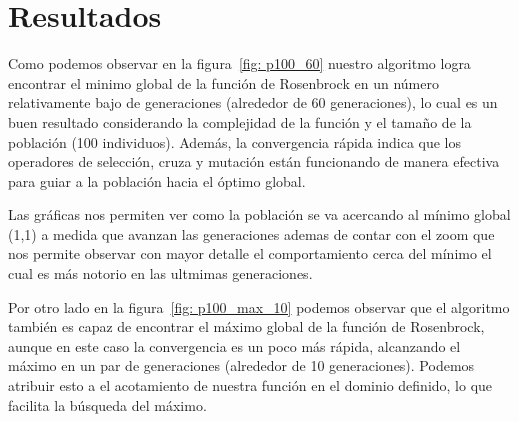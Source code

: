 \section{Resultados}

Como podemos observar en la figura~\ref{fig: p100_60} nuestro algoritmo logra encontrar el minimo global 
de la función de Rosenbrock en un número relativamente bajo de generaciones (alrededor de 60 generaciones), 
lo cual es un buen resultado considerando la complejidad de la función y el tamaño de la población (100 individuos).
Además, la convergencia rápida indica que los operadores de selección, cruza y mutación están funcionando de manera 
efectiva para guiar a la población hacia el óptimo global.

Las gráficas nos permiten ver como la población se va acercando al mínimo global (1,1) a medida que avanzan 
las generaciones ademas de contar con el zoom que nos permite observar con mayor detalle el comportamiento
cerca del mínimo el cual es más notorio en las ultmimas generaciones.

Por otro lado en la figura~\ref{fig: p100_max_10} podemos observar que el algoritmo también es capaz de encontrar
el máximo global de la función de Rosenbrock, aunque en este caso la convergencia es un poco más rápida, 
alcanzando el máximo en un par de generaciones (alrededor de 10 generaciones). Podemos atribuir esto a el 
acotamiento de nuestra función en el dominio definido, lo que facilita la búsqueda del máximo.